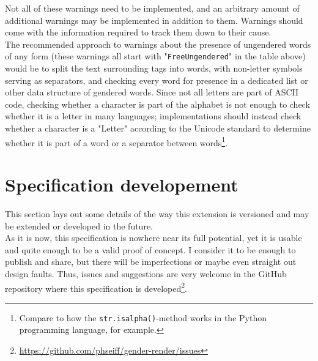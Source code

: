 \documentclass{article}
\begin{document}
    Not all of these warnings need to be implemented, and an arbitrary amount of additional warnings may be implemented in addition to them.
    Warnings should come with the information required to track them down to their cause.\\

    The recommended approach to warnings about the presence of ungendered words of any form (these warnings all start with "\texttt{FreeUngendered}" in the table above) would be to split the text surrounding tags into words, with non-letter symbols serving as separators, and checking every word for presence in a dedicated list or other data structure of gendered words.
    Since not all letters are part of ASCII code, checking whether a character is part of the alphabet is not enough to check whether it is a letter in many languages;
    implementations should instead check whether a character is a "Letter" according to the Unicode standard to determine whether it is part of a word or a separator between words\footnote{Compare to how the \texttt{str.isalpha()}-method works in the Python programming language, for example.}.\\

\section{Specification developement}

    This section lays out some details of the way this extension is versioned and may be extended or developed in the future.\\

    As it is now, this specification is nowhere near its full potential, yet it is usable and quite enough to be a valid proof of concept.
    I consider it to be enough to publish and share, but there will be imperfections or maybe even straight out design faults.
    Thus, issues and suggestions are very welcome in the GitHub repository where this specification is developed\footnote{\url{https://github.com/phseiff/gender-render/issues}}.\\
\end{document}
